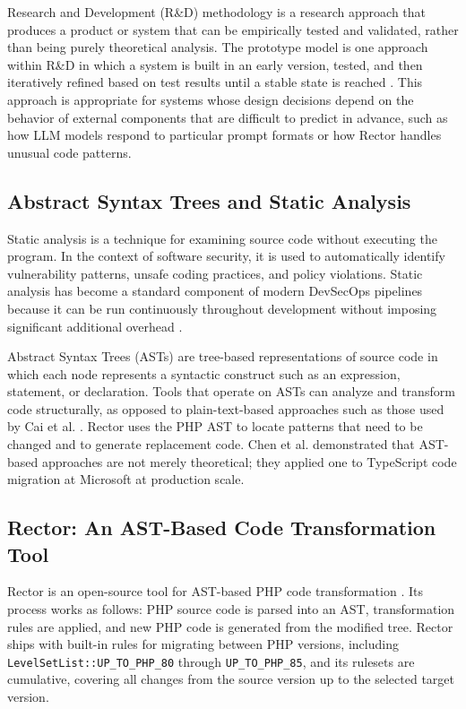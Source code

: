 Research and Development (R\&D) methodology is a research approach that produces a product or system that can be empirically tested and validated, rather than being purely theoretical analysis. The prototype model is one approach within R\&D in which a system is built in an early version, tested, and then iteratively refined based on test results until a stable state is reached \cite{pressman2019}. This approach is appropriate for systems whose design decisions depend on the behavior of external components that are difficult to predict in advance, such as how LLM models respond to particular prompt formats or how Rector handles unusual code patterns.

\subsection{Abstract Syntax Trees and Static Analysis}

Static analysis is a technique for examining source code without executing the program. In the context of software security, it is used to automatically identify vulnerability patterns, unsafe coding practices, and policy violations. Static analysis has become a standard component of modern DevSecOps pipelines because it can be run continuously throughout development without imposing significant additional overhead \cite{li2025software}.

Abstract Syntax Trees (ASTs) are tree-based representations of source code in which each node represents a syntactic construct such as an expression, statement, or declaration. Tools that operate on ASTs can analyze and transform code structurally, as opposed to plain-text-based approaches such as those used by Cai et al. \cite{cai2015pattern}. Rector uses the PHP AST to locate patterns that need to be changed and to generate replacement code. Chen et al. \cite{chen2022ast} demonstrated that AST-based approaches are not merely theoretical; they applied one to TypeScript code migration at Microsoft at production scale.

\subsection{Rector: An AST-Based Code Transformation Tool}
\label{subsec:rector}

Rector is an open-source tool for AST-based PHP code transformation \cite{rector2024}. Its process works as follows: PHP source code is parsed into an AST, transformation rules are applied, and new PHP code is generated from the modified tree. Rector ships with built-in rules for migrating between PHP versions, including \texttt{LevelSetList::UP\_TO\_PHP\_80} through \texttt{UP\_TO\_PHP\_85}, and its rulesets are cumulative, covering all changes from the source version up to the selected target version.

